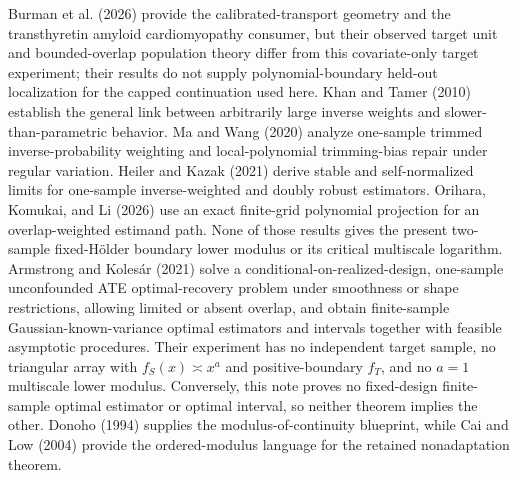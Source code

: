 Burman et al. (2026) provide the calibrated-transport geometry and the transthyretin amyloid cardiomyopathy consumer, but their observed target unit and bounded-overlap population theory differ from this covariate-only target experiment; their results do not supply polynomial-boundary held-out localization for the capped continuation used here. Khan and Tamer (2010) establish the general link between arbitrarily large inverse weights and slower-than-parametric behavior. Ma and Wang (2020) analyze one-sample trimmed inverse-probability weighting and local-polynomial trimming-bias repair under regular variation. Heiler and Kazak (2021) derive stable and self-normalized limits for one-sample inverse-weighted and doubly robust estimators. Orihara, Komukai, and Li (2026) use an exact finite-grid polynomial projection for an overlap-weighted estimand path. None of those results gives the present two-sample fixed-H\"older boundary lower modulus or its critical multiscale logarithm. Armstrong and Koles\'ar (2021) solve a conditional-on-realized-design, one-sample unconfounded ATE optimal-recovery problem under smoothness or shape restrictions, allowing limited or absent overlap, and obtain finite-sample Gaussian-known-variance optimal estimators and intervals together with feasible asymptotic procedures. Their experiment has no independent target sample, no triangular array with \(f_S(x)\asymp x^a\) and positive-boundary \(f_T\), and no \(a=1\) multiscale lower modulus. Conversely, this note proves no fixed-design finite-sample optimal estimator or optimal interval, so neither theorem implies the other. Donoho (1994) supplies the modulus-of-continuity blueprint, while Cai and Low (2004) provide the ordered-modulus language for the retained nonadaptation theorem.